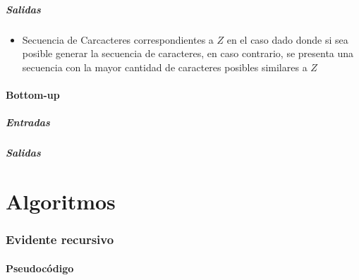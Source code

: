 \documentclass[]{article}
\numberwithin{equation}{section}
\numberwithin{figure}{section}
\theoremstyle{definition}
\begin{document}
\subsubsection*{Salidas}

\begin{itemize}

\item Secuencia de Carcacteres correspondientes a $Z$ en el caso dado donde si sea posible generar la secuencia de caracteres, en caso contrario, se presenta una secuencia con la mayor cantidad de caracteres posibles similares a $Z$

\end{itemize}

\subsection*{Bottom-up}

\subsubsection*{Entradas}

\subsubsection*{Salidas}

\part*{Algoritmos}

\section*{Evidente recursivo}
	
	\subsection*{Pseudocódigo}
	
\end{document}
